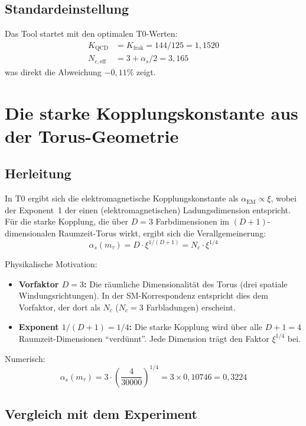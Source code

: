	\subsection{Standardeinstellung}
	
	Das Tool startet mit den optimalen T0-Werten:
	\begin{align}
		K_\text{QCD} &= K_\text{frak} = 144/125 = 1{,}1520 \\
		N_{c,\text{eff}} &= 3 + \alpha_s/2 = 3{,}165
	\end{align}
	was direkt die Abweichung $-0{,}11\%$ zeigt.
	
	
	\section{Die starke Kopplungskonstante aus der Torus-Geometrie}
	\label{sec:alpha_s}
	
	\subsection{Herleitung}
	
	In T0 ergibt sich die elektromagnetische Kopplungskonstante als $\alpha_\text{EM} \propto \xi$, wobei der Exponent~1 der einen (elektromagnetischen) Ladungsdimension entspricht. Für die starke Kopplung, die über $D = 3$ Farbdimensionen im $(D+1)$-dimensionalen Raumzeit-Torus wirkt, ergibt sich die Verallgemeinerung:
	\begin{equation}
		\alpha_s(m_\tau) = D \cdot \xi^{1/(D+1)} = N_c \cdot \xi^{1/4}
	\end{equation}
	
	Physikalische Motivation:
	\begin{itemize}
		\item \textbf{Vorfaktor $D = 3$:} Die räumliche Dimensionalität des Torus (drei spatiale Windungsrichtungen). In der SM-Korrespondenz entspricht dies dem Vorfaktor, der dort als $N_c$ ($N_c=3$ Farbladungen) erscheint.
		\item \textbf{Exponent $1/(D+1) = 1/4$:} Die starke Kopplung wird über alle $D+1 = 4$ Raumzeit-Dimensionen ``verdünnt''. Jede Dimension trägt den Faktor $\xi^{1/4}$ bei.
	\end{itemize}
	
	Numerisch:
	\begin{equation}
		\alpha_s(m_\tau) = 3 \cdot \left(\frac{4}{30000}\right)^{1/4} = 3 \times 0{,}10746 = 0{,}3224
	\end{equation}
	
	\subsection{Vergleich mit dem Experiment}
	
